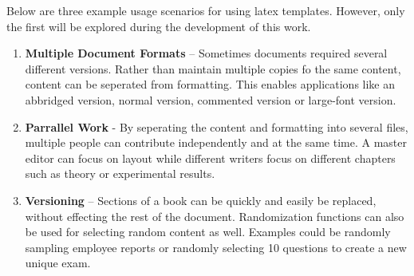 \label{sec:introduction_applications}
Below are three example usage scenarios for using latex templates. However, only the first will be explored during the development of this work.

\begin{enumerate}
    \item \textbf{Multiple Document Formats} – Sometimes documents required several different versions. Rather than maintain multiple copies fo the same content, content can be seperated from formatting. This enables applications like an abbridged version, normal version, commented version or large-font version.

    \item \textbf{Parrallel Work} - By seperating the content and formatting into several files, multiple people can contribute independently and at the same time. A master editor can focus on layout while different writers focus on different chapters such as theory or experimental results.

    \item \textbf{Versioning} – Sections of a book can be quickly and easily be replaced, without effecting the rest of the document. Randomization functions can also be used for selecting random content as well. Examples could be randomly sampling employee reports or randomly selecting 10 questions to create a new unique exam.
\end{enumerate}